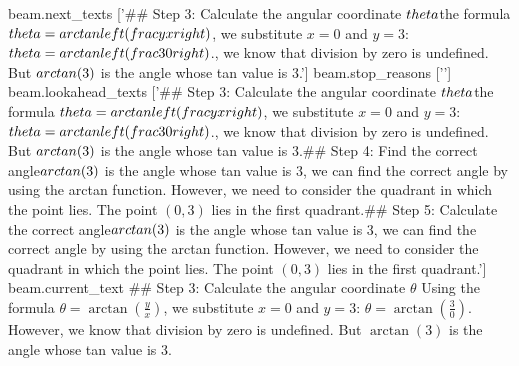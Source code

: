 beam.next_texts
['## Step 3: Calculate the angular coordinate $\\theta$\nUsing the formula $\\theta = \\arctan\\left(\\frac{y}{x}\\right)$, we substitute $x = 0$ and $y = 3$:\n$\\theta = \\arctan\\left(\\frac{3}{0}\\right)$.\nHowever, we know that division by zero is undefined. But $\\arctan(3)$ is the angle whose tan value is 3.\n\n']
beam.stop_reasons
['\n\n']
beam.lookahead_texts
['## Step 3: Calculate the angular coordinate $\\theta$\nUsing the formula $\\theta = \\arctan\\left(\\frac{y}{x}\\right)$, we substitute $x = 0$ and $y = 3$:\n$\\theta = \\arctan\\left(\\frac{3}{0}\\right)$.\nHowever, we know that division by zero is undefined. But $\\arctan(3)$ is the angle whose tan value is 3.\n\n## Step 4: Find the correct angle\nSince $\\arctan(3)$ is the angle whose tan value is 3, we can find the correct angle by using the arctan function. However, we need to consider the quadrant in which the point lies. The point $(0,3)$ lies in the first quadrant.\n\n## Step 5: Calculate the correct angle\nSince $\\arctan(3)$ is the angle whose tan value is 3, we can find the correct angle by using the arctan function. However, we need to consider the quadrant in which the point lies. The point $(0,3)$ lies in the first quadrant.\n\n']
beam.current_text
## Step 3: Calculate the angular coordinate $\theta$
Using the formula $\theta = \arctan\left(\frac{y}{x}\right)$, we substitute $x = 0$ and $y = 3$:
$\theta = \arctan\left(\frac{3}{0}\right)$.
However, we know that division by zero is undefined. But $\arctan(3)$ is the angle whose tan value is 3.


